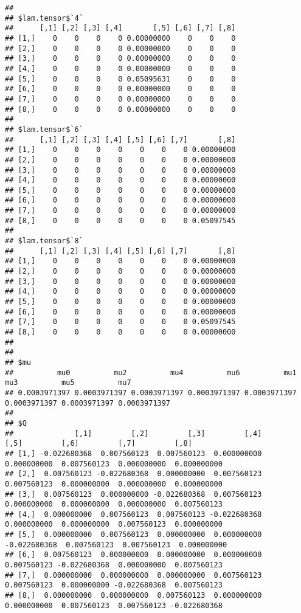 \documentclass[
]{article}
\begin{document}
\begin{verbatim}
## 
## $lam.tensor$`4`
##      [,1] [,2] [,3] [,4]       [,5] [,6] [,7] [,8]
## [1,]    0    0    0    0 0.00000000    0    0    0
## [2,]    0    0    0    0 0.00000000    0    0    0
## [3,]    0    0    0    0 0.00000000    0    0    0
## [4,]    0    0    0    0 0.00000000    0    0    0
## [5,]    0    0    0    0 0.05095631    0    0    0
## [6,]    0    0    0    0 0.00000000    0    0    0
## [7,]    0    0    0    0 0.00000000    0    0    0
## [8,]    0    0    0    0 0.00000000    0    0    0
## 
## $lam.tensor$`6`
##      [,1] [,2] [,3] [,4] [,5] [,6] [,7]       [,8]
## [1,]    0    0    0    0    0    0    0 0.00000000
## [2,]    0    0    0    0    0    0    0 0.00000000
## [3,]    0    0    0    0    0    0    0 0.00000000
## [4,]    0    0    0    0    0    0    0 0.00000000
## [5,]    0    0    0    0    0    0    0 0.00000000
## [6,]    0    0    0    0    0    0    0 0.00000000
## [7,]    0    0    0    0    0    0    0 0.00000000
## [8,]    0    0    0    0    0    0    0 0.05097545
## 
## $lam.tensor$`8`
##      [,1] [,2] [,3] [,4] [,5] [,6] [,7]       [,8]
## [1,]    0    0    0    0    0    0    0 0.00000000
## [2,]    0    0    0    0    0    0    0 0.00000000
## [3,]    0    0    0    0    0    0    0 0.00000000
## [4,]    0    0    0    0    0    0    0 0.00000000
## [5,]    0    0    0    0    0    0    0 0.00000000
## [6,]    0    0    0    0    0    0    0 0.00000000
## [7,]    0    0    0    0    0    0    0 0.05097545
## [8,]    0    0    0    0    0    0    0 0.00000000
## 
## 
## $mu
##          mu0          mu2          mu4          mu6          mu1          mu3          mu5          mu7 
## 0.0003971397 0.0003971397 0.0003971397 0.0003971397 0.0003971397 0.0003971397 0.0003971397 0.0003971397 
## 
## $Q
##              [,1]         [,2]         [,3]         [,4]         [,5]         [,6]         [,7]         [,8]
## [1,] -0.022680368  0.007560123  0.007560123  0.000000000  0.000000000  0.007560123  0.000000000  0.000000000
## [2,]  0.007560123 -0.022680368  0.000000000  0.007560123  0.007560123  0.000000000  0.000000000  0.000000000
## [3,]  0.007560123  0.000000000 -0.022680368  0.007560123  0.000000000  0.000000000  0.000000000  0.007560123
## [4,]  0.000000000  0.007560123  0.007560123 -0.022680368  0.000000000  0.000000000  0.007560123  0.000000000
## [5,]  0.000000000  0.007560123  0.000000000  0.000000000 -0.022680368  0.007560123  0.007560123  0.000000000
## [6,]  0.007560123  0.000000000  0.000000000  0.000000000  0.007560123 -0.022680368  0.000000000  0.007560123
## [7,]  0.000000000  0.000000000  0.000000000  0.007560123  0.007560123  0.000000000 -0.022680368  0.007560123
## [8,]  0.000000000  0.000000000  0.007560123  0.000000000  0.000000000  0.007560123  0.007560123 -0.022680368
\end{verbatim}
\end{document}
